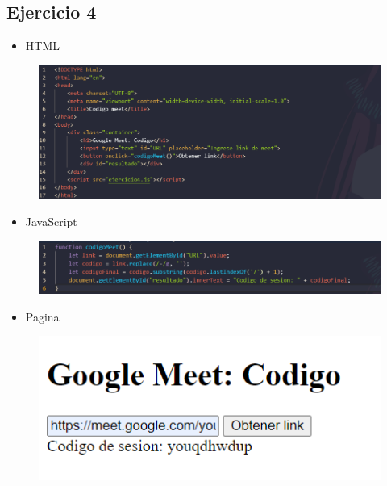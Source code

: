 \documentclass{article}
\begin{document}
	\subsection{Ejercicio 4}
	\begin{itemize}
		\item HTML
	\end{itemize}
	\begin{figure}[H]
		\centering
		\includegraphics[width=1.0\textwidth, keepaspectratio]{img/ejercicio4a}
	\end{figure}
	\begin{itemize}
		\item JavaScript
	\end{itemize}
	\begin{figure}[H]
		\centering
		\includegraphics[width=1.0\textwidth, keepaspectratio]{img/ejercicio4b}
	\end{figure}
	\begin{itemize}
		\item Pagina
	\end{itemize}
	\begin{figure}[H]
		\centering
		\includegraphics[width=1.0\textwidth, keepaspectratio]{img/ejercicio4c}
	\end{figure}
	
\end{document}

